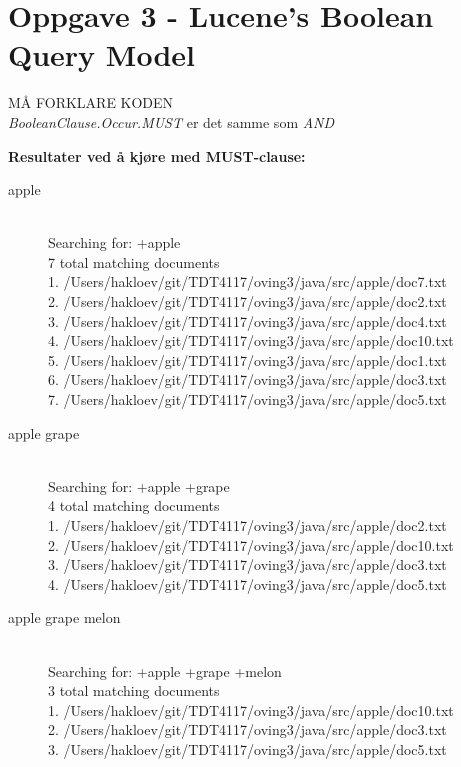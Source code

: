 \section*{Oppgave 3 - Lucene's Boolean Query Model}

MÅ FORKLARE KODEN\\

\noindent \textit{BooleanClause.Occur.MUST} er det samme som \textit{AND}

\vspace{5mm}
\noindent \textbf{Resultater ved å kjøre med MUST-clause:}


\begin{description}
    \item[apple] \hfill \\
    Searching for: +apple \hfill \\
	7 total matching documents \hfill \\
	1. /Users/hakloev/git/TDT4117/oving3/java/src/apple/doc7.txt \hfill \\
	2. /Users/hakloev/git/TDT4117/oving3/java/src/apple/doc2.txt \hfill \\
	3. /Users/hakloev/git/TDT4117/oving3/java/src/apple/doc4.txt \hfill \\
	4. /Users/hakloev/git/TDT4117/oving3/java/src/apple/doc10.txt \hfill \\
	5. /Users/hakloev/git/TDT4117/oving3/java/src/apple/doc1.txt \hfill \\
	6. /Users/hakloev/git/TDT4117/oving3/java/src/apple/doc3.txt \hfill \\
	7. /Users/hakloev/git/TDT4117/oving3/java/src/apple/doc5.txt \hfill \\
    \item[apple grape] \hfill \\
    Searching for: +apple +grape \hfill \\
	4 total matching documents \hfill \\
	1. /Users/hakloev/git/TDT4117/oving3/java/src/apple/doc2.txt \hfill \\
	2. /Users/hakloev/git/TDT4117/oving3/java/src/apple/doc10.txt \hfill \\
	3. /Users/hakloev/git/TDT4117/oving3/java/src/apple/doc3.txt \hfill \\
	4. /Users/hakloev/git/TDT4117/oving3/java/src/apple/doc5.txt \hfill \\
    \item[apple grape melon] \hfill \\
    Searching for: +apple +grape +melon \hfill \\
	3 total matching documents \hfill \\
	1. /Users/hakloev/git/TDT4117/oving3/java/src/apple/doc10.txt \hfill \\ 
	2. /Users/hakloev/git/TDT4117/oving3/java/src/apple/doc3.txt \hfill \\
	3. /Users/hakloev/git/TDT4117/oving3/java/src/apple/doc5.txt \hfill \\
\end{description}

\noindent   
